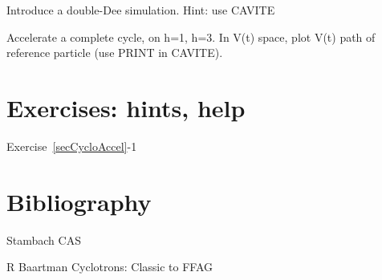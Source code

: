 Introduce a double-Dee simulation. Hint: use CAVITE

Accelerate a complete cycle, on h=1, h=3. In V(t) space, plot V(t) path of reference particle (use PRINT in CAVITE). 






\section{Exercises: hints, help}

\noindent {\small $\bullet$} Exercise~\ref{secCycloAccel}-1 


\section{Bibliography}

Stambach CAS

R Baartman Cyclotrons: Classic to FFAG

